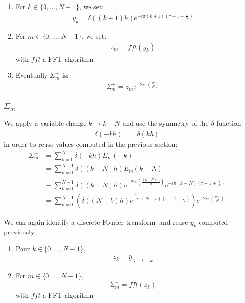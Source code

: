 \begin{enumerate}
\item For $k\in\{0,\hdots,N-1\}$, we set:
\begin{align}
y_{k}=\delta((k+1)h)e^{-i\pi (k+1)\left(\tau-1+\frac{1}{N}\right)}
\end{align}
\item For $m \in\{0,\hdots,N-1\}$, we set:
\begin{align}
  z_{m}=fft(y_{k})
\end{align}
with $fft$ a FFT algorithm
\item Eventually $\Sigma_{m}^{+}$ is:
\begin{align*}
  \Sigma_{m}^{+}=z_{m}e^{-2i\pi\left(\frac{m}{N}\right)}
\end{align*}
\end{enumerate}

\subsubsection{\texorpdfstring{$\Sigma_{m}^{-}$}{sigma-}}

We apply a variable change $k \rightarrow k-N$ and use the symmetry of the $\delta$ function
\begin{align*}
\delta(-kh)=&\bar{\delta}(kh)
\end{align*}
in order to reuse values computed in the previous section:
\begin{align*}
\Sigma_{m}^{-}&=\sum_{k=1}^{N}\delta(-kh)E_{m}(-k)\\
  &=\sum_{k=0}^{N-1}\delta((k-N)h)E_{m}(k-N)\\
  &=\sum_{k=0}^{N-1}\delta((k-N)h) e^{-2i\pi\left(\frac{(k-N) m}{N}\right)}e^{-i\pi (k-N)\left(\tau-1+\frac{1}{N}\right)}\\
  &=\sum_{k=0}^{N-1}\left(\overline{\delta((N-k)h) e^{-i\pi (N-k)\left(\tau-1+\frac{1}{N}\right)}}\right) e^{-2i\pi\left(\frac{k m}{N}\right)} 
\end{align*}

We can again identify a discrete Fourier transform, and reuse $y_k$ computed previously.
\begin{enumerate}
\item Pour $k\in\{0,\hdots,N-1\}$,
\begin{align}
z_{k}= \bar{y}_{N-1-k}
\end{align}
\item For $m \in\{0,\hdots,N-1\}$,
\begin{align}
  \Sigma_{m}^{-}=fft(z_{k})
\end{align}
with $fft$ a FFT algorithm
\end{enumerate}


